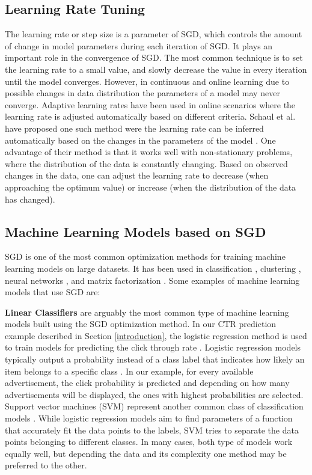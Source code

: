 \documentclass{vldb}
\begin{document}
\subsection{Learning Rate Tuning} \label{learning-rate}
The learning rate or step size is a parameter of SGD, which controls the amount of change in model parameters during each iteration of SGD.
It plays an important role in the convergence of SGD.
The most common technique is to set the learning rate to a small value, and slowly decrease the value in every iteration until the model converges.
However, in continuous and online learning due to possible changes in data distribution the parameters of a model may never converge.
Adaptive learning rates have been used in online scenarios where the learning rate is adjusted automatically based on different criteria.
Schaul et al. have proposed one such method were the learning rate can be inferred automatically based on the changes in the parameters of the model \cite{schaul2013no}. 
One advantage of their method is that it works well with non-stationary problems, where the distribution of the data is constantly changing. 
Based on observed changes in the data, one can adjust the learning rate to decrease (when approaching the optimum value) or increase (when the distribution of the data has changed).

\subsection{Machine Learning Models based on SGD}
SGD is one of the most common optimization methods for training machine learning models on large datasets. 
It has been used in classification \cite{zhang2004solving}, clustering \cite{bottou1995convergence}, neural networks \cite{dean2012large}, and matrix factorization \cite{funk2006netflix}.
Some examples of machine learning models that use SGD are: 

\textbf{Linear Classifiers} are arguably the most common type of machine learning models built using the SGD optimization method. 
In our CTR prediction example described in Section \ref{introduction}, the logistic regression method is used to train models for predicting the click through rate \cite{macmahan2013}. 
Logistic regression models typically output a probability instead of a class label that indicates how likely an item belongs to a specific class \cite{hosmer2013applied}.
In our example, for every available advertisement, the click probability is predicted and depending on how many advertisements will be displayed, the ones with highest probabilities are selected.
Support vector machines (SVM) represent another common class of classification models \cite{steinwart2008support}.
While logistic regression models aim to find parameters of a function that accurately fit the data points to the labels, SVM tries to separate the data points belonging to different classes. 
In many cases, both type of models work equally well, but depending the data and its complexity one method may be preferred to the other.
\end{document}
